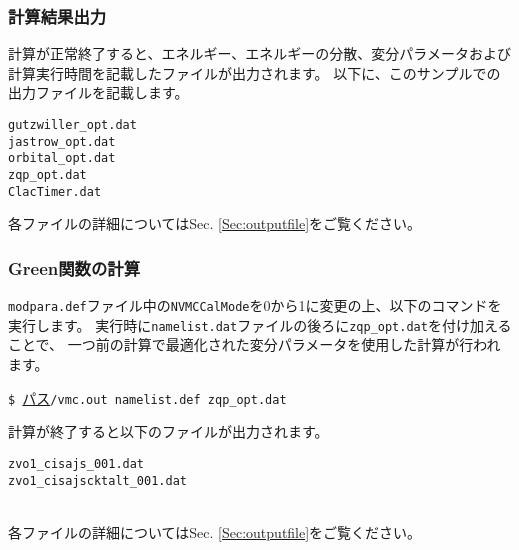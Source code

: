 \subsubsection{計算結果出力}
計算が正常終了すると、エネルギー、エネルギーの分散、変分パラメータおよび計算実行時間を記載したファイルが出力されます。
以下に、このサンプルでの出力ファイルを記載します。\\
\begin{minipage}{12cm}
\begin{screen}
\begin{verbatim}
gutzwiller_opt.dat
jastrow_opt.dat
orbital_opt.dat
zqp_opt.dat
ClacTimer.dat
\end{verbatim}
\end{screen}
\end{minipage}

各ファイルの詳細についてはSec. \ref{Sec:outputfile}をご覧ください。


\subsubsection{Green関数の計算}
\verb|modpara.def|ファイル中の\verb|NVMCCalMode|を0から1に変更の上、以下のコマンドを実行します。
実行時に\verb|namelist.dat|ファイルの後ろに\verb|zqp_opt.dat|を付け加えることで、
一つ前の計算で最適化された変分パラメータを使用した計算が行われます。

\vspace{1cm}\hspace{-0.7cm}
\verb|$ |\underline{パス}\verb|/vmc.out namelist.def zqp_opt.dat|
\small

計算が終了すると以下のファイルが出力されます。
\\
\begin{minipage}{12cm}
\begin{screen}
\begin{verbatim}
zvo1_cisajs_001.dat
zvo1_cisajscktalt_001.dat
\end{verbatim}
\end{screen}
\end{minipage}
\\
各ファイルの詳細についてはSec. \ref{Sec:outputfile}をご覧ください。



